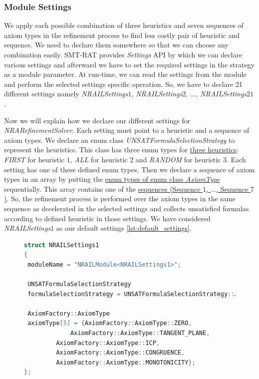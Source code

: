\subsubsection{Module Settings}
\label{subsubsec:Module_Settings}
\begin{sloppypar}
We apply each possible combination of three heuristics and seven sequences of axiom types in the refinement process to find less costly pair of heuristic and sequence.
We need to declare them somewhere so that we can choose any combination easily.
SMT-RAT provides \textit{Settings} API by which we can declare various settings and afterward we have to set the required settings in the strategy as a module parameter.
At run-time, we can read the settings from the module and perform the selected settings specific operation.
So, we have to declare 21 different settings namely \textit{NRAILSettings$1$}, \textit{NRAILSettings$2$}, $\dots$, \textit{NRAILSettings$21$}.\newline

\noindent Now we will explain how we declare our different settings for \textit{NRARefinementSolver}.
Each setting must point to a heuristic and a sequence of axiom types.
We declare an enum class \textit{UNSATFormulaSelectionStrategy} to represent the heuristics.
This class has three enum types for \hyperref[item:heuristics]{three heuristics}: \textit{FIRST} for heuristic $1$, \textit{ALL} for heuristic $2$ and \textit{RANDOM} for heuristic $3$.
Each setting has one of these defined enum types.
Then we declare a sequence of axiom types in an array by putting the \hyperref[table:axiomType]{enum types of enum class \textit{AxiomType}} sequentially.
This array contains one of the \hyperref[item:sequences]{sequences (Sequence $1$, $\dots$, Sequence $7$)}.
So, the refinement process is performed over the axiom types in the same sequence as decelerated in the selected settings and collects unsatisfied formulas according to defined heuristic in those settings.
We have considered \textit{NRAILSettings$1$} as our default settings \ref{lst:default_settings}.\newline
\end{sloppypar}

\begin{figure}[!ht]
\begin{lstlisting}[language=C++,label=lst:default_settings, caption={Default settings}]
struct NRAILSettings1
{
 moduleName = "NRAILModule<NRAILSettings1>";

 UNSATFormulaSelectionStrategy 
 formulaSelectionStrategy = UNSATFormulaSelectionStrategy::ALL;

 AxiomFactory::AxiomType
 axiomType[5] = {AxiomFactory::AxiomType::ZERO,
	         AxiomFactory::AxiomType::TANGENT_PLANE,
		 AxiomFactory::AxiomType::ICP,
		 AxiomFactory::AxiomType::CONGRUENCE,
		 AxiomFactory::AxiomType::MONOTONICITY};
};
\end{lstlisting}
\end{figure}

